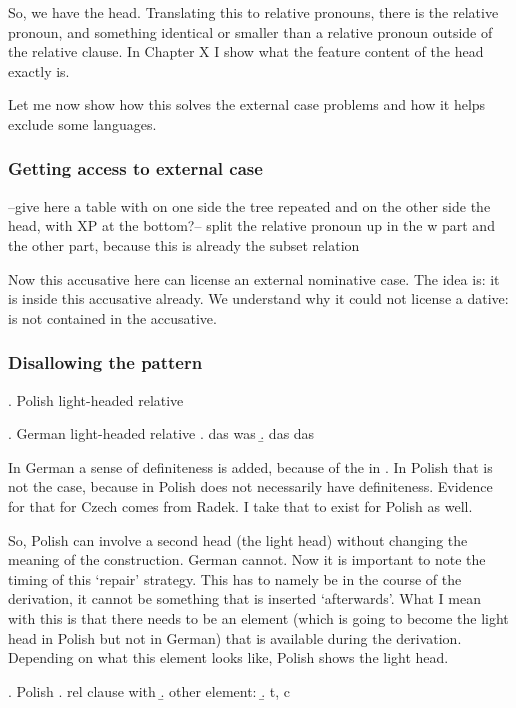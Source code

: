 So, we have the head. Translating this to relative pronouns, there is the relative pronoun, and something identical or smaller than a relative pronoun outside of the relative clause. In Chapter X I show what the feature content of the head exactly is.

Let me now show how this solves the external case problems and how it helps exclude some languages.


\subsubsection{Getting access to external case}

--give here a table with on one side the tree repeated and on the other side the head, with XP at the bottom?--
split the relative pronoun up in the w part and the other part, because this is already the subset relation

Now this accusative here can license an external nominative case. The idea is: it is inside this accusative already. We understand why it could not license a dative:  is not contained in the accusative.


\subsubsection{Disallowing the pattern}

\ex. Polish light-headed relative

\ex. German light-headed relative
\a. das was
\b. das das

In German a sense of definiteness is added, because of the  in . In Polish that is not the case, because  in Polish does not necessarily have definiteness. Evidence for that for Czech comes from Radek. I take that to exist for Polish as well.

So, Polish can involve a second head (the light head) without changing the meaning of the construction. German cannot. Now it is important to note the timing of this `repair' strategy. This has to namely be in the course of the derivation, it cannot be something that is inserted `afterwards'. What I mean with this is that there needs to be an element (which is going to become the light head in Polish but not in German) that is available during the derivation. Depending on what this element looks like, Polish shows the light head.

\ex. Polish
\a. rel clause with 
\b. other element: 
\b. t, c

